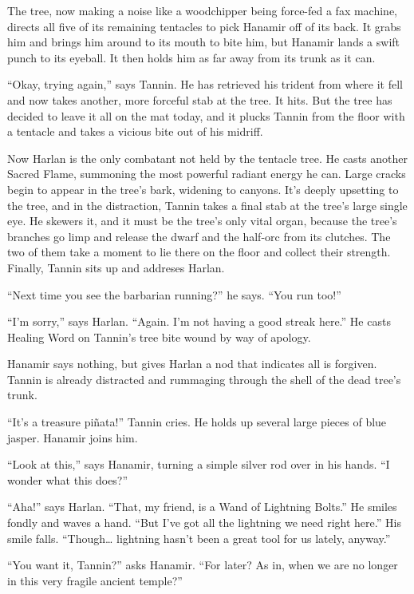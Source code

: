 \documentclass[smalldemyvopaper,11pt,twoside,onecolumn,openright,extrafontsizes]{memoir}
\begin{document}
The tree, now making a noise like a woodchipper being force-fed a fax
machine, directs all five of its remaining tentacles to pick Hanamir off
of its back. It grabs him and brings him around to its mouth to bite
him, but Hanamir lands a swift punch to its eyeball. It then holds him
as far away from its trunk as it can.

``Okay, trying again,'' says Tannin. He has retrieved his trident from
where it fell and now takes another, more forceful stab at the tree. It
hits. But the tree has decided to leave it all on the mat today, and it
plucks Tannin from the floor with a tentacle and takes a vicious bite
out of his midriff.

Now Harlan is the only combatant not held by the tentacle tree. He casts
another Sacred Flame, summoning the most powerful radiant energy he can.
Large cracks begin to appear in the tree's bark, widening to canyons.
It's deeply upsetting to the tree, and in the distraction, Tannin takes
a final stab at the tree's large single eye. He skewers it, and it must
be the tree's only vital organ, because the tree's branches go limp and
release the dwarf and the half-orc from its clutches. The two of them
take a moment to lie there on the floor and collect their strength.
Finally, Tannin sits up and addreses Harlan.

``Next time you see the barbarian running?'' he says. ``You run too!''

``I'm sorry,'' says Harlan. ``Again. I'm not having a good streak
here.'' He casts Healing Word on Tannin's tree bite wound by way of
apology.

Hanamir says nothing, but gives Harlan a nod that indicates all is
forgiven. Tannin is already distracted and rummaging through the shell
of the dead tree's trunk.

``It's a treasure piñata!'' Tannin cries. He holds up several large
pieces of blue jasper. Hanamir joins him.

``Look at this,'' says Hanamir, turning a simple silver rod over in his
hands. ``I wonder what this does?''

``Aha!'' says Harlan. ``That, my friend, is a Wand of Lightning Bolts.''
He smiles fondly and waves a hand. ``But I've got all the lightning we
need right here.'' His smile falls. ``Though\ldots{} lightning hasn't
been a great tool for us lately, anyway.''

``You want it, Tannin?'' asks Hanamir. ``For later? As in, when we are
no longer in this very fragile ancient temple?''
\end{document}
